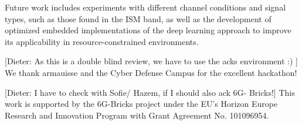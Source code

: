 \documentclass[sigconf, 10pt, nonacm, anonymous]{acmart}  %
\newcommand{\dieter}[1]{{\color{blue}[Dieter: #1]}}
\begin{document}
Future work includes experiments with different channel conditions and signal types, such as those found in the ISM band, as well as the development of optimized embedded implementations of the deep learning approach to improve its applicability in resource-constrained environments.

\begin{acks}
\dieter{As this is a double blind review, we have to use the acks environment :) }
We thank armauisse and the Cyber Defense Campus for the excellent hackathon!

\dieter{I have to check with Sofie/ Hazem, if I should also ack 6G- Bricks!}
This work is supported by the 6G-Bricks project under the EU’s Horizon Europe Research and Innovation Program with Grant Agreement No. 101096954.
\end{acks}
\balance













\end{document}
